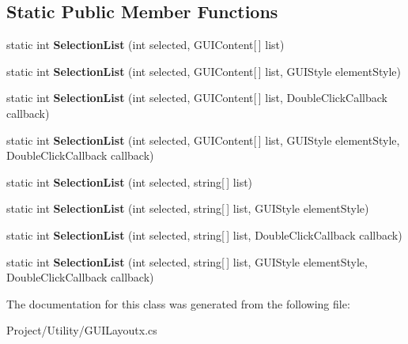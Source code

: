 \subsection*{Static Public Member Functions}
\begin{DoxyCompactItemize}
\item 
\mbox{\label{class_g_u_i_layoutx_ad25129cd2a63a9b2d72f768711e5b09e}} 
static int {\bfseries Selection\+List} (int selected, G\+U\+I\+Content\mbox{[}$\,$\mbox{]} list)
\item 
\mbox{\label{class_g_u_i_layoutx_acf6b0ce4afa68d4dfeb3d467b51cf6d6}} 
static int {\bfseries Selection\+List} (int selected, G\+U\+I\+Content\mbox{[}$\,$\mbox{]} list, G\+U\+I\+Style element\+Style)
\item 
\mbox{\label{class_g_u_i_layoutx_a0486e17aae6ac685aef28b61147b2599}} 
static int {\bfseries Selection\+List} (int selected, G\+U\+I\+Content\mbox{[}$\,$\mbox{]} list, Double\+Click\+Callback callback)
\item 
\mbox{\label{class_g_u_i_layoutx_a49a3c8b55ec118415fe1417745fe24ce}} 
static int {\bfseries Selection\+List} (int selected, G\+U\+I\+Content\mbox{[}$\,$\mbox{]} list, G\+U\+I\+Style element\+Style, Double\+Click\+Callback callback)
\item 
\mbox{\label{class_g_u_i_layoutx_a80c9693ce79b3399df719eb0a863036c}} 
static int {\bfseries Selection\+List} (int selected, string\mbox{[}$\,$\mbox{]} list)
\item 
\mbox{\label{class_g_u_i_layoutx_a54af5b8182a348153cbaa9352715f2a5}} 
static int {\bfseries Selection\+List} (int selected, string\mbox{[}$\,$\mbox{]} list, G\+U\+I\+Style element\+Style)
\item 
\mbox{\label{class_g_u_i_layoutx_afc5bda68b00aa83ce169df14d87ff979}} 
static int {\bfseries Selection\+List} (int selected, string\mbox{[}$\,$\mbox{]} list, Double\+Click\+Callback callback)
\item 
\mbox{\label{class_g_u_i_layoutx_a8149d23447ddc591ce33d74a897ceea1}} 
static int {\bfseries Selection\+List} (int selected, string\mbox{[}$\,$\mbox{]} list, G\+U\+I\+Style element\+Style, Double\+Click\+Callback callback)
\end{DoxyCompactItemize}


The documentation for this class was generated from the following file\+:\begin{DoxyCompactItemize}
\item 
Project/\+Utility/G\+U\+I\+Layoutx.\+cs\end{DoxyCompactItemize}
